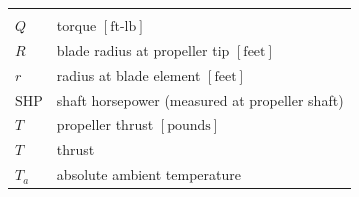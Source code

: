 \documentclass[
]{book}
\begin{document}
\begin{longtable}[]{@{}ll@{}}
\begin{minipage}[t]{0.80\columnwidth}
\end{minipage}\tabularnewline
\begin{minipage}[t]{0.14\columnwidth}\raggedright
\(Q\)\strut
\end{minipage} & \begin{minipage}[t]{0.80\columnwidth}\raggedright
torque \(\left[ \text{ft-lb} \right]\)\strut
\end{minipage}\tabularnewline
\begin{minipage}[t]{0.14\columnwidth}\raggedright
\(R\)\strut
\end{minipage} & \begin{minipage}[t]{0.80\columnwidth}\raggedright
blade radius at propeller tip \(\left[ \text{feet} \right]\)\strut
\end{minipage}\tabularnewline
\begin{minipage}[t]{0.14\columnwidth}\raggedright
\(r\)\strut
\end{minipage} & \begin{minipage}[t]{0.80\columnwidth}\raggedright
radius at blade element \(\left[ \text{feet} \right]\)\strut
\end{minipage}\tabularnewline
\begin{minipage}[t]{0.14\columnwidth}\raggedright
\(\mathrm{SHP}\)\strut
\end{minipage} & \begin{minipage}[t]{0.80\columnwidth}\raggedright
shaft horsepower (measured at propeller shaft)\strut
\end{minipage}\tabularnewline
\begin{minipage}[t]{0.14\columnwidth}\raggedright
\(T\)\strut
\end{minipage} & \begin{minipage}[t]{0.80\columnwidth}\raggedright
propeller thrust \(\left[ \text{pounds} \right]\)\strut
\end{minipage}\tabularnewline
\begin{minipage}[t]{0.14\columnwidth}\raggedright
\(T\)\strut
\end{minipage} & \begin{minipage}[t]{0.80\columnwidth}\raggedright
thrust\strut
\end{minipage}\tabularnewline
\begin{minipage}[t]{0.14\columnwidth}\raggedright
\(T_a\)\strut
\end{minipage} & \begin{minipage}[t]{0.80\columnwidth}\raggedright
absolute ambient temperature\strut
\end{minipage}\tabularnewline

\end{longtable}
\end{document}
